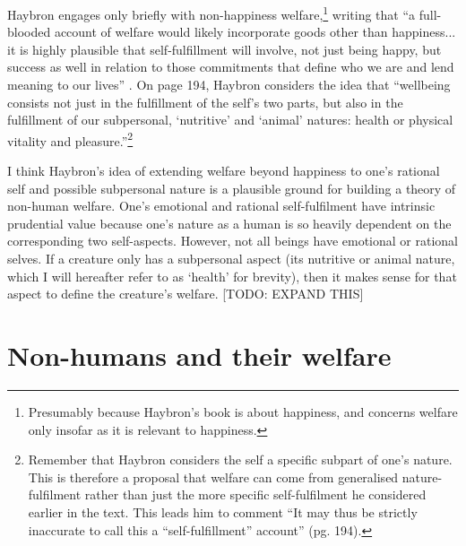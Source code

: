 \documentclass{article}
\begin{document}
Haybron engages only briefly with non-happiness welfare,\footnote{Presumably because Haybron's book is about happiness, and concerns welfare only insofar as it is relevant to happiness.} writing that ``a full-blooded account of welfare would likely incorporate goods other than happiness... it is highly plausible that self-fulfillment will involve, not just being happy, but success as well in relation to those commitments that define who we are and lend meaning to our lives'' \citep[193]{haybron2008pursuit}. On page 194, Haybron considers the idea that ``wellbeing consists not just in the fulfillment of the self's two parts, but also in the fulfillment of our subpersonal, `nutritive' and `animal' natures: health or physical vitality and pleasure.''\footnote{Remember that Haybron considers the self a specific subpart of one's nature. This is therefore a proposal that welfare can come from generalised nature-fulfilment rather than just the more specific self-fulfilment he considered earlier in the text. This leads him to comment ``It may thus be strictly inaccurate to call this a ``self-fulfillment'' account'' (pg. 194).} 

I think Haybron's idea of extending welfare beyond happiness \textemdash{} to one's rational self and possible subpersonal nature \textemdash{} is a plausible ground for building a theory of non-human welfare. One's emotional and rational self-fulfilment have intrinsic prudential value because one's nature as a human is so heavily dependent on the corresponding two self-aspects. However, not all beings have emotional or rational selves. If a creature only has a subpersonal aspect (its nutritive or animal nature, which I will hereafter refer to as `health' for brevity), then it makes sense for that aspect to define the creature's welfare. [TODO: EXPAND THIS]

\section{Non-humans and their welfare}








\end{document}
